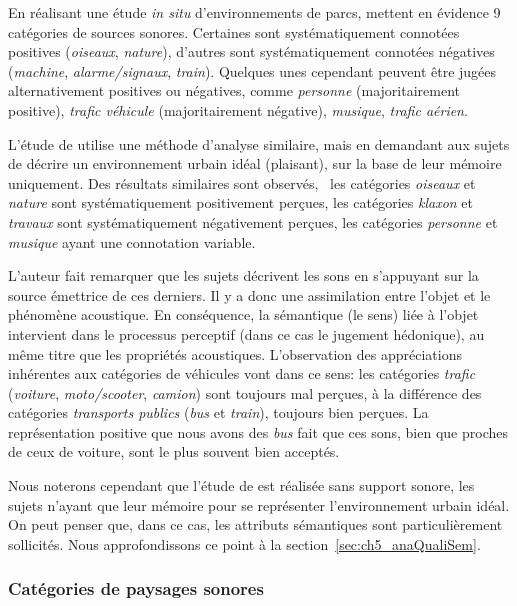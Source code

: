 En réalisant une étude \emph{in situ} d'environnements de parcs, \citep{szeremeta2009analysis} mettent en évidence 9 catégories de sources sonores. Certaines sont systématiquement connotées positives (\emph{oiseaux}, \emph{nature}), d'autres sont systématiquement connotées négatives (\emph{machine}, \emph{alarme/signaux}, \emph{train}). Quelques unes cependant peuvent être jugées alternativement positives ou négatives, comme \emph{personne} (majoritairement positive), \emph{trafic véhicule} (majoritairement négative), \emph{musique}, \emph{trafic aérien}.

L'étude de \citep{guastavino2006ideal} utilise une méthode d'analyse similaire, mais en demandant aux sujets de décrire un environnement urbain idéal (plaisant), sur la base de leur mémoire uniquement. Des résultats similaires sont observés, \ie~les catégories \emph{oiseaux} et \emph{nature} sont systématiquement positivement perçues, les catégories \emph{klaxon} et \emph{travaux} sont systématiquement négativement perçues, les catégories \emph{personne} et \emph{musique} ayant une connotation variable.

L'auteur fait remarquer que les sujets décrivent les sons en s'appuyant sur la source émettrice de ces derniers. Il y a donc une assimilation entre l'objet et le phénomène acoustique. En conséquence, la sémantique (le sens) liée à l'objet intervient dans le processus perceptif (dans ce cas le jugement hédonique), au même titre que les propriétés acoustiques. L'observation des appréciations inhérentes aux catégories de véhicules vont dans ce sens: les catégories \emph{trafic} (\emph{voiture}, \emph{moto/scooter}, \emph{camion}) sont toujours mal perçues, à la différence des catégories \emph{transports publics} (\emph{bus} et \emph{train}), toujours bien perçues. La représentation positive que nous avons des \emph{bus} fait que ces sons, bien que proches de ceux de voiture, sont le plus souvent bien acceptés.  

Nous noterons cependant que l'étude de \citep{guastavino2006ideal} est réalisée sans support sonore, les sujets n'ayant que leur mémoire pour se représenter l'environnement urbain idéal. On peut penser que, dans ce cas, les attributs sémantiques sont particulièrement sollicités. Nous approfondissons ce point à la section~\ref{sec:ch5_anaQualiSem}.  

\subsubsection{Catégories de paysages sonores}
\label{sec:ch3_catsoundscape}

